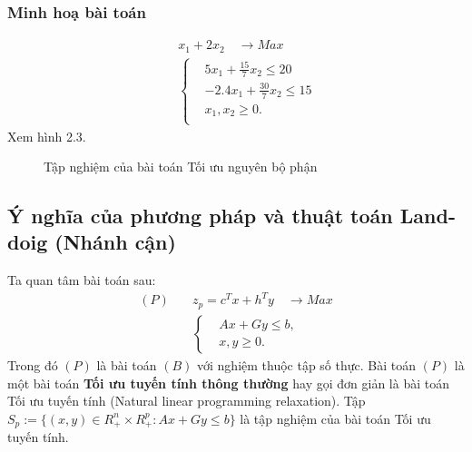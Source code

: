 \documentclass[12pt,a4paper]{report}
\begin{document}
\subsubsection*{Minh hoạ bài toán}
   \begin{equation}
        \begin{split}
        \quad & x_1 + 2x_2 \quad \longrightarrow Max \\
                    & \left\{\begin{split}
                    & 5x_1 + \frac{15}{7}x_2 \leq 20 \\
                    & -2.4x_1 + \frac{30}{7}x_2 \leq 15 \\
                    &x_1, x_2 \geq 0. \\
                    \end{split}\right.    
        \end{split}
        \end{equation}            
Xem hình 2.3.

\begin{figure} \label{bophan}
\center	
{}  
\caption{Tập nghiệm của bài toán Tối ưu nguyên bộ phận}
\end{figure}

    
\subsection{Ý nghĩa của phương pháp và thuật toán Land-doig (Nhánh cận)}

Ta quan tâm bài toán sau:
\begin{equation}\label{P}
\begin{split}
(P) \quad & z_p=c^Tx+h^Ty \quad \longrightarrow Max \\
            & \left\{\begin{split}
                &Ax+Gy \leq  b, \\
                &x,y \geq 0.
            \end{split}\right.    
\end{split}
\end{equation}
Trong đó $(P)$ là bài toán $(B)$ với nghiệm thuộc tập số thực.
Bài toán $(P)$ là một bài toán \textbf{Tối ưu tuyến tính thông thường} hay gọi đơn giản là bài toán Tối ưu tuyến tính (Natural linear programming relaxation).
Tập $S_p:=\{(x,y)\in R^n_+\times R^p_+: Ax+Gy\leq b\}$ là tập nghiệm của bài toán Tối ưu tuyến tính.
\end{document}
